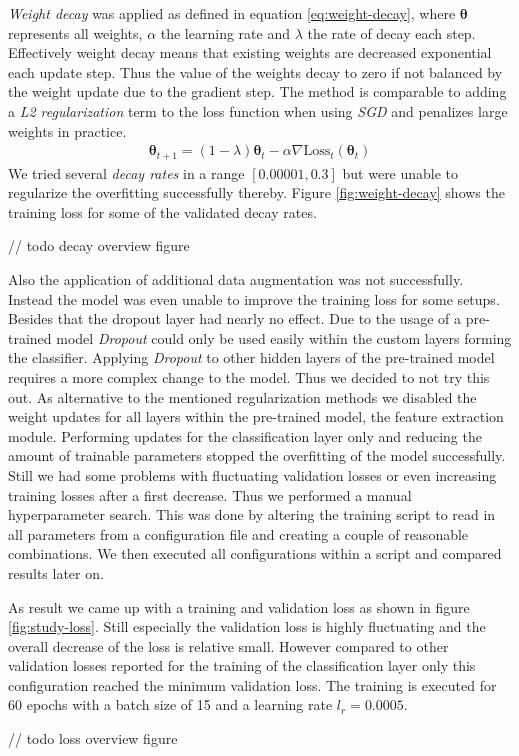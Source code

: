 \textit{Weight decay} was applied as defined in equation \ref{eq:weight-decay}, where $\boldsymbol{\theta}$ represents all weights, $\alpha$ the learning rate and $\lambda$ the rate of decay each step. Effectively weight decay means that existing weights are decreased exponential each update step. Thus the value of the weights decay to zero if not balanced by the weight update due to the gradient step. The method is comparable to adding a \textit{L2 regularization} term to the loss function when using \textit{SGD} \autocite{loshchilov2017decoupled} and penalizes large weights in practice.
\begin{align}\label{eq:weight-decay}
	\boldsymbol{\theta}_{t+1} = \left( 1 - \lambda \right) \boldsymbol{\theta}_{t} - \alpha \nabla \text{Loss}_t \left( \boldsymbol{\theta}_{t} \right)
\end{align}
We tried several \textit{decay rates} in a range $[0.00001, 0.3]$ but were unable to regularize the overfitting successfully thereby. Figure \ref{fig:weight-decay} shows the training loss for some of the validated decay rates.

// todo decay overview figure

Also the application of additional data augmentation was not successfully. Instead the model was even unable to improve the training loss for some setups. Besides that the dropout layer had nearly no effect. Due to the usage of a pre-trained model \textit{Dropout} could only be used easily within the custom layers forming the classifier. Applying \textit{Dropout} to other hidden layers of the pre-trained model requires a more complex change to the model. Thus we decided to not try this out.
As alternative to the mentioned regularization methods we disabled the weight updates for all layers within the pre-trained model, the feature extraction module. Performing updates for the classification layer only and reducing the amount of trainable parameters stopped the overfitting of the model successfully. Still we had some problems with fluctuating validation losses or even increasing training losses after a first decrease. Thus we performed a manual hyperparameter search. This was done by altering the training script to read in all parameters from a configuration file and creating a couple of reasonable combinations. We then executed all configurations within a script and compared results later on.

As result we came up with a training and validation loss as shown in figure \ref{fig:study-loss}. Still especially the validation loss is highly fluctuating and the overall decrease of the loss is relative small. However compared to other validation losses reported for the training of the classification layer only this configuration reached the minimum validation loss. The training is executed for 60 epochs with a batch size of 15 and a learning rate $l_r = 0.0005$.

// todo loss overview figure